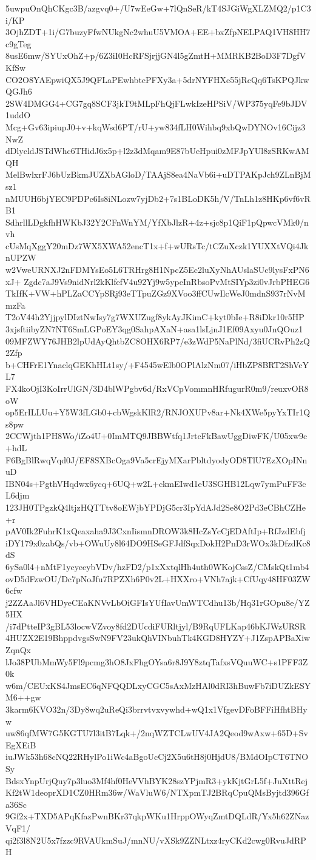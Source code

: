 5uwpuOnQhCKgc3B/azgvq0+/U7wEeGw+7lQnSeR/kT4SJGiWgXLZMQ2/p1C3i/KP
3OjhZDT+1i/G7buzyFfwNUkgNc2whuU5VMOA+EE+bxZfpNELPAQ1VH8HH7c9gTeg
8usE6mw/SYUxOhZ+p/6Z3iI0HcRFSjrjjGN4l5gZmtH+MMRKB2BoD3F7DgfVKfSw
CO2O8YAEpwiQX5J9QFLaPEwhbtcPFXy3a+5drNYFHXe55jRcQq6TsKPQJkwQGJh6
2SW4DMGG4+CG7gq8SCF3jkT9tMLpFhQjFLwkIzeHPSiV/WP375yqFe9bJDV1uddO
Mcg+Gv63ipiupJ0+v+kqWsd6PT/rU+yw834fLH0Wihbq9xbQwDYNOv16Cijz3NwZ
dDlycldJSTdWhc6THidJ6x5p+l2z3dMqam9E87bUeHpui0zMFJpYUl8zSRKwAMQH
MelBwlxrFJ6bUzBkmJUZXbAGloD/TAAjS8ea4NaVb6i+uDTPAKpJch9ZLnBjMsz1
nMUUH6bjYEC9PDPc6Is8iNLozw7yjDb2+7s1BLoDK5h/V/TnLh1z8HKp6vf6vRB1
SdhrllLDgkfhHWKbJ32Y2CFnWnYM/YfXbJlzR+4z+sjc8p1QiF1pQpwcVMk0/nvh
cUsMqXggY20mDz7WX5XWA52encT1x+f+wURsTc/tCZuXczk1YUXXtVQi4JknUPZW
w2VweURNXJ2nFDMYsEo5L6TRHrg8H1NpcZ5Ec2luXyNhAUslaSUc9lysFxPN6xJ+
Zgdc7aJ9Vs9nidNrl2kKlfefV4u92Yj9w5ypeInRbsoPvMtSIYp3zi0vJrbPHEG6
TkIfK+VW+hPLZaCCYpSRj93eTTpuZGz9XVoo3ffCUwIlcWeJ0mdnS937rNvMmzFa
T2oV44h2YjjpylDIztNwIsy7g7WXUZugf8ykAyJKimC+kyt0bIe+R8iDkr10r5HP
3xjsftiibyZN7NT6SmLGPoEY3qg0SahpAXaN+asa1lsLjnJ1Ef09Axyu0JnQOuz1
09MFZWY76JHB2lpUdAyQhtbZC8OHX6RP7/e3zWdP5NaPlNd/3fiUCRvPh2zQ2Zfp
b+CHFrE1YnaclqGEKhHLt1sy/+F4545wElb0OPlAlzNm07/iHbZP8BRT2ShVcYL7
FX4koOjI3KoIrrUlGN/3D4blWPgbv6d/RxVCpVommnHRfugurR0m9/reuxvOR8oW
op5ErILLUu+Y5W3fLGb0+cbWgskKlR2/RNJOXUPv8ar+Nk4XWe5pyYxTIr1Qs8pw
2CCWjth1PH8Wo/iZo4U+0ImMTQ9JBBWtfq1JrtcFkBawUggDiwFK/U05xw9c+hdL
F6BgBlRwqVqd0J/EF8SXBcOga9Va5crEjyMXarPbltdyodyOD8TlU7EzXOpINnuD
IBN04s+PgthVHqdwx6ycq+6UQ+w2L+ckmEIwd1eU3SGHB12Lqw7ymPuFF3cL6djm
123JH0TPgzkQ4ltjzHQTTtv8oEWjbYPDjG5cr3IpYdAJd2Se8O2Pd3eCBhCZHe+r
pAV0Ik2FuhrK1xQeaxaha9J3CxnIismnDROW3k8HcZsYcCjEDAftIp+RfJzdEbfj
iDY179x0zabQs/vb+OWuUy8l64DO9HSeGFJdfSqxDokH2PnD3rWOx3kDfzdKc8dS
6ySa0l4+nMtF1ycyeeybVDv/hzFD2/p1xXxtqlHh4uth0WKojCssZ/CMskQt1mb4
ovD5dFzwOU/Dc7pNoJfu7RPZXh6P0v2L+HXXro+VNh7ajk+CfUqy48HF03ZW6cfw
j2ZZAaJl6VHDyeCEaKNVvLbOiGFIsYUfIavUmWTCdhu13b/Hq31rGOpu8e/YZ5HX
/i7dPtteIP3gBL53locwVZvoy8fd2DUcdiFURltjyl/B9RqUFLKap46bKJWzURSR
4HUZX2E19BhppdvgsSwN9FV23ukQhVINbuhTk4KGD8HYZY+J1ZspAPBaXiwZqnQx
lJo38PUbMmWy5Fl9pcmg3hO8JxFhgOYsa6r8J9Y8ztqTafxsVQuuWC+s1PFF3Z0k
w6m/CEUxKS4JmsEC6qNFQQDLxyCGC5sAxMzHAl0dRI3hBuwFb7iDUZkESYM6++gw
3karm6KVO32n/3Dy8wq2uReQi3brrvtvxvywhd+wQ1x1VfgevDFoBFFiHfhtBHyw
uw86qfMW7G5KGTU7l3itB7Lqk+/2nqWZTCLwUV4JA2Qeod9wAxw+65D+SvEgXEiB
iuJWk53h68cNQ22RHylPo1iWc4aBgoUcCj2X5u6tH8j0HjdU8/BMdOIpCT6TNOSy
BdsxYnpUrjQuy7p3luo3Mf4hf0HeVVhBYK28szYPjmR3+ykKjtGrL5f+JuXttRej
Kf2tW1deoprXD1CZ0HRm36w/WaVluW6/NTXpmTJ2BRqCpuQMsByjtd396Gfa36Sc
9Gf2x+TXD5APqKfazPwnBKr37qkpWKu1HrppOWyqZmtDQLdR/Yx5h62ZNazVqF1/
qi2f3l8N2U5x7fzzc9RVAUkmSuJ/mnNU/vXSk9ZZNLtxz4ryCKd2cwg0RvuJdRPH
